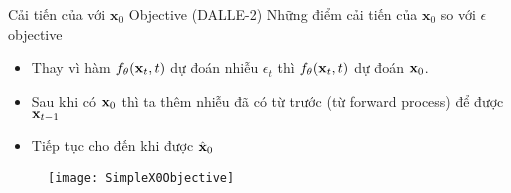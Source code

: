 
\begin{frame}{Cải tiến của  với $\mathbf{x}_0$ Objective (DALLE-2)}
	Những điểm cải tiến của $\mathbf{x}_0$ so với $\epsilon$ objective
	\begin{itemize}
		\item Thay vì hàm $f_{\theta}(\mathbf{x}_t, t)$ dự đoán nhiễu $\epsilon_t$ thì  $f_{\theta}(\mathbf{x}_t, t)$ dự đoán $\mathbf{x}_0$.
		\item Sau khi có $\mathbf{x}_0$ thì ta thêm nhiễu đã có từ trước (từ forward process) để được $\mathbf{x}_{t-1}$
		\item Tiếp tục cho đến khi được $\hat{\mathbf{x}}_0$
		
	\end{itemize} 
	
	\begin{figure}
		\centering
		\texttt{[image: SimpleX0Objective]}
	\end{figure}
	
\end{frame}

